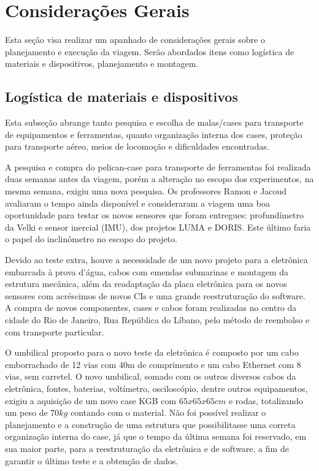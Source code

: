 \section{Considerações Gerais}
Esta seção visa realizar um apanhado de considerações gerais sobre o
planejamento e execução da viagem. Serão abordados itens como logística de
materiais e dispositivos, planejamento e montagem.

\subsection{Logística de materiais e dispositivos}
Esta subseção abrange tanto pesquisa e escolha de malas/cases para
transporte de equipamentos e ferramentas, quanto organização interna dos
cases, proteção para transporte aéreo, meios de locomoção e dificuldades
encontradas.

A pesquisa e compra do pelican-case para transporte de ferramentas foi
realizada duas semanas antes da viagem, porém a alteração no escopo dos experimentos, na mesma
semana, exigiu uma nova pesquisa. Os professores Ramon e Jacoud avaliaram o
tempo ainda disponível e consideraram a viagem uma boa oportunidade para testar
os novos sensores que foram entregues:
profundímetro da Velki e sensor inercial (IMU), dos projetos LUMA e DORIS. Este
último faria o papel do inclinômetro no escopo do projeto. 

Devido ao teste extra, houve a necessidade de um novo projeto para a eletrônica
embarcada à prova d'água, cabos com emendas submarinas e montagem da estrutura mecânica, além da readaptação da placa eletrônica para os novos sensores com acréscimos de novos
CIs e uma grande reestruturação do software. A compra de novos componentes,
cases e cabos foram realizadas no centro da cidade do Rio de Janeiro, Rua
República do Líbano, pelo método de reembolso e com transporte particular.

O umbilical proposto para o novo teste da eletrônica é composto por um cabo
emborrachado de 12 vias com 40m de comprimento e um cabo Ethernet com 8 vias,
sem carretel.
O novo umbilical, somado com os outros diversos cabos da eletrônica, fontes,
baterias, voltímetro, osciloscópio, dentre outros equipamentos, exigiu a
aquisição de um novo case KGB com $65x65x65cm$ e rodas, totalizando um peso de
$70kg$ contando com o material.
Não foi possível realizar o planejamento e a construção de uma estrutura que
possibilitasse uma correta organização interna do case, já que o tempo da
última semana foi reservado, em sua maior parte, para a reestruturação da eletrônica e de software, a fim de garantir o último teste e a obtenção de dados.

